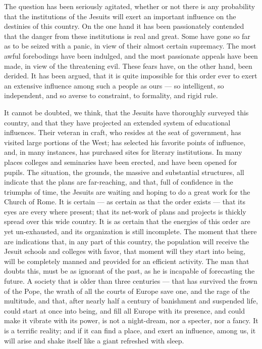 \documentclass[]{book}
\begin{document}
The question has been seriously agitated, whether or not there is any probability that the institutions of the Jesuits will exert an important influence on the destinies of this country. On the one hand it has been passionately contended that the danger from these institutions is real and great. Some have gone so far as to be seized with a panic, in view of their almost certain supremacy. The most awful forebodings have been indulged, and the most passionate appeals have been made, in view of the threatening evil. These fears have, on the other hand, been derided. It has been argued, that it is quite impossible for this order ever to exert an extensive influence among such a people as ours --- so intelligent, so independent, and so averse to constraint, to formality, and rigid rule.

It cannot be doubted, we think, that the Jesuits have thoroughly surveyed this country, and that they have projected an extended system of educational influences. Their veteran in craft, who resides at the seat of government, has visited large portions of the West; has selected his favorite points of influence, and, in many instances, has purchased sites for literary institutions. In many places colleges and seminaries have been erected, and have been opened for pupils. The situation, the grounds, the massive and substantial structures, all indicate that the plans are far-reaching, and that, full of confidence in the triumphs of time, the Jesuits are waiting and hoping to do a great work for the Church of Rome. It is certain --- as certain as that the order exists --- that its eyes are every where present; that its net-work of plans and projects is thickly spread over this wide country. It is as certain that the energies of this order are yet un-exhausted, and its organization is still incomplete. The moment that there are indications that, in any part of this country, the population will receive the Jesuit schools and colleges with favor, that moment will they start into being, will be completely manned and provided for an efficient activity. The man that doubts this, must be as ignorant of the past, as he is incapable of forecasting the future. A society that is older than three centuries --- that has survived the frown of the Pope, the wrath of all the courts of Europe save one, and the rage of the multitude, and that, after nearly half a century of banishment and suspended life, could start at once into being, and fill all Europe with its presence, and could make it vibrate with its power, is not a night-dream, nor a specter, nor a fancy. It is a terrific reality; and if it can find a place, and exert an influence, among us, it will arise and shake itself like a giant refreshed with sleep.
\end{document}
